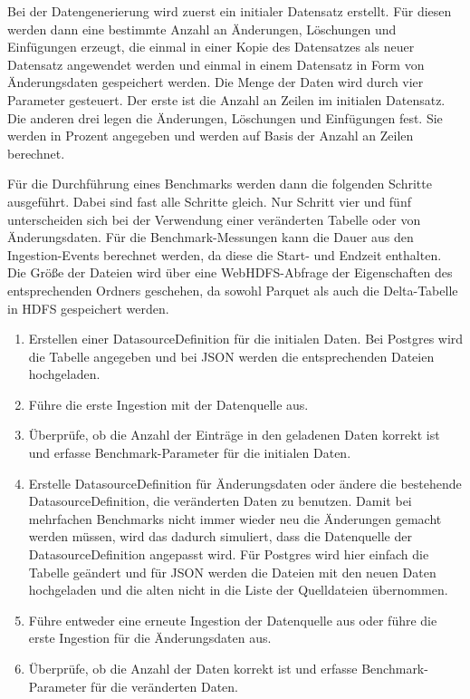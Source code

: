 Bei der Datengenerierung wird zuerst ein initialer Datensatz erstellt.
Für diesen werden dann eine bestimmte Anzahl an Änderungen, Löschungen und Einfügungen erzeugt, die einmal in einer Kopie des Datensatzes als neuer Datensatz angewendet werden und einmal in einem Datensatz in Form von Änderungsdaten gespeichert werden.
Die Menge der Daten wird durch vier Parameter gesteuert.
Der erste ist die Anzahl an Zeilen im initialen Datensatz.
Die anderen drei legen die Änderungen, Löschungen und Einfügungen fest.
Sie werden in Prozent angegeben und werden auf Basis der Anzahl an Zeilen berechnet.

Für die Durchführung eines Benchmarks werden dann die folgenden Schritte ausgeführt.
Dabei sind fast alle Schritte gleich.
Nur Schritt vier und fünf unterscheiden sich bei der Verwendung einer veränderten Tabelle oder von Änderungsdaten.
Für die Benchmark-Messungen kann die Dauer aus den Ingestion-Events berechnet werden, da diese die Start- und Endzeit enthalten.
Die Größe der Dateien wird über eine WebHDFS-Abfrage der Eigenschaften des entsprechenden Ordners geschehen, da sowohl Parquet als auch die Delta-Tabelle in HDFS gespeichert werden.
\begin{enumerate}
    \item Erstellen einer DatasourceDefinition für die initialen Daten.
          Bei Postgres wird die Tabelle angegeben und bei JSON werden die entsprechenden Dateien hochgeladen.
    \item Führe die erste Ingestion mit der Datenquelle aus.
    \item Überprüfe, ob die Anzahl der Einträge in den geladenen Daten korrekt ist und erfasse Benchmark-Parameter für die initialen Daten.
    \item Erstelle DatasourceDefinition für Änderungsdaten oder ändere die bestehende DatasourceDefinition, die veränderten Daten zu benutzen.
          Damit bei mehrfachen Benchmarks nicht immer wieder neu die Änderungen gemacht werden müssen, wird das dadurch simuliert, dass die Datenquelle der DatasourceDefinition angepasst wird. Für Postgres wird hier einfach die Tabelle geändert und für JSON werden die Dateien mit den neuen Daten hochgeladen und die alten nicht in die Liste der Quelldateien übernommen.
    \item Führe entweder eine erneute Ingestion der Datenquelle aus oder führe die erste Ingestion für die Änderungsdaten aus.
    \item Überprüfe, ob die Anzahl der Daten korrekt ist und erfasse Benchmark-Parameter für die veränderten Daten.
\end{enumerate}

